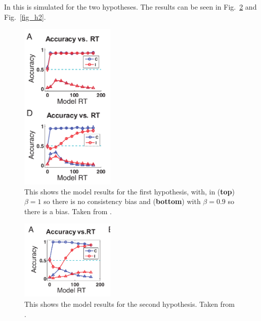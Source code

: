 \documentclass[12pt]{article}
\begin{document}
In \cite{YuDayanCohen2009} this is simulated for the two hypotheses. The results can be seen in Fig.~\ref{fig_h1} and Fig.~\ref{fig_h2}.
 



\begin{figure}[tb]
\begin{center}
  \includegraphics[width=4.5cm]{flanker_model1.png}
\end{center}
\caption{This shows the model results for the first hypothesis, with, in (\textbf{top}) $\beta=1$ so there is no consistency bias and (\textbf{bottom}) with $\beta=0.9$ so there is a bias. Taken from \cite{YuDayanCohen2009}. \label{fig_h1}}
\end{figure}


\begin{figure}[tb]
\begin{center}
  \includegraphics[width=4.5cm]{flanker_model2.png}
\end{center}
\caption{This shows the model results for the second hypothesis. Taken from \cite{YuDayanCohen2009}. \label{fig_h1}}
\end{figure}





{}
\end{document}
